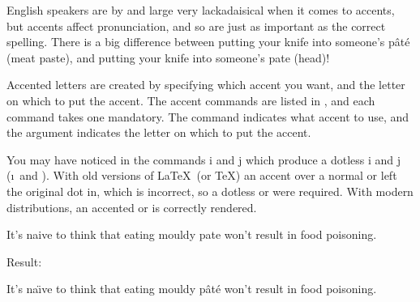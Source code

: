 \label{obj:accents}%
English speakers are by and large very lackadaisical when it comes
to accents, but accents affect pronunciation, and so are just as
important as the correct spelling. There is a big difference
between putting your knife into someone's p\^at\'e (meat paste), and
putting your knife into someone's pate (head)!

Accented letters are created by specifying which accent you want, and
the letter on which to put the accent.  The accent commands are
listed in , and each command takes one
\gls{mandatory}.  The command indicates
what accent to use, and the argument indicates the letter on which to put
the accent.

You may have noticed in  the commands \gls{i}
and \gls{j} which produce a dotless i and j (\i\ and \dotlessj).
With old versions of \LaTeX\ (or \TeX) an accent over a normal
 or  left the original dot in, which is incorrect, so a
dotless \dq{\i} or \dq{\dotlessj} were required. With modern
distributions, an accented  or  is correctly rendered.

\bookpagebreak
{}
\begin{code}
It's naive to think that eating mouldy 
pate won't result in food poisoning.
\end{code}%
Result:
\begin{resultS}
It's na\"{\i}ve to think that eating mouldy p\^at\'e won't result in food poisoning.
\end{resultS}%

